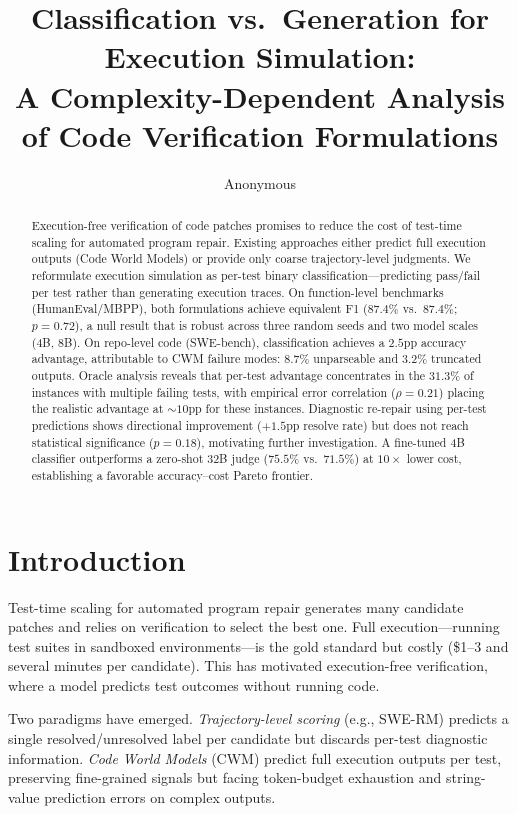 \documentclass[11pt,a4paper]{article}
\title{Classification vs.\ Generation for Execution Simulation:\\A Complexity-Dependent Analysis of Code Verification Formulations}
\author{Anonymous}
\begin{document}
\maketitle

\begin{abstract}
Execution-free verification of code patches promises to reduce the cost of test-time scaling for automated program repair. Existing approaches either predict full execution outputs (Code World Models) or provide only coarse trajectory-level judgments. We reformulate execution simulation as per-test binary classification---predicting pass/fail per test rather than generating execution traces. On function-level benchmarks (HumanEval/MBPP), both formulations achieve equivalent F1 ($87.4\%$ vs.\ $87.4\%$; $p{=}0.72$), a null result that is robust across three random seeds and two model scales (4B, 8B). On repo-level code (SWE-bench), classification achieves a $2.5$pp accuracy advantage, attributable to CWM failure modes: $8.7\%$ unparseable and $3.2\%$ truncated outputs. Oracle analysis reveals that per-test advantage concentrates in the $31.3\%$ of instances with multiple failing tests, with empirical error correlation ($\rho{=}0.21$) placing the realistic advantage at ${\sim}10$pp for these instances. Diagnostic re-repair using per-test predictions shows directional improvement ($+1.5$pp resolve rate) but does not reach statistical significance ($p{=}0.18$), motivating further investigation. A fine-tuned 4B classifier outperforms a zero-shot 32B judge ($75.5\%$ vs.\ $71.5\%$) at $10{\times}$ lower cost, establishing a favorable accuracy--cost Pareto frontier.
\end{abstract}

\section{Introduction}
\label{sec:intro}

Test-time scaling for automated program repair generates many candidate patches and relies on verification to select the best one. Full execution---running test suites in sandboxed environments---is the gold standard but costly (\$1--3 and several minutes per candidate). This has motivated execution-free verification, where a model predicts test outcomes without running code.

Two paradigms have emerged. \emph{Trajectory-level scoring} (e.g., SWE-RM) predicts a single resolved/unresolved label per candidate but discards per-test diagnostic information. \emph{Code World Models} (CWM) predict full execution outputs per test, preserving fine-grained signals but facing token-budget exhaustion and string-value prediction errors on complex outputs.
\end{document}
